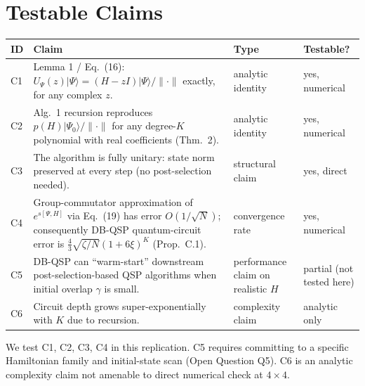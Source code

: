 \documentclass[11pt]{article}
\begin{document}
\section{Testable Claims}
\begin{table}[h]
\centering\small
\begin{tabular}{lp{7.8cm}ll}
\toprule
\textbf{ID} & \textbf{Claim} & \textbf{Type} & \textbf{Testable?} \\
\midrule
C1 & Lemma 1 / Eq.~(16): $U_\Psi(z)\lvert\Psi\rangle = (H-zI)\lvert\Psi\rangle/\lVert\cdot\rVert$ exactly, for any complex $z$. & analytic identity & yes, numerical \\
C2 & Alg.~1 recursion reproduces $p(H)\lvert\Psi_0\rangle/\lVert\cdot\rVert$ for any degree-$K$ polynomial with real coefficients (Thm.~2). & analytic identity & yes, numerical \\
C3 & The algorithm is fully unitary: state norm preserved at every step (no post-selection needed). & structural claim & yes, direct \\
C4 & Group-commutator approximation of $e^{s[\Psi,H]}$ via Eq.~(19) has error $O(1/\sqrt{N})$; consequently DB-QSP quantum-circuit error is $\tfrac{4}{3}\sqrt{\zeta/N}(1+6\xi)^K$ (Prop.~C.1). & convergence rate & yes, numerical \\
C5 & DB-QSP can ``warm-start'' downstream post-selection-based QSP algorithms when initial overlap $\gamma$ is small. & performance claim on realistic $H$ & partial (not tested here) \\
C6 & Circuit depth grows super-exponentially with $K$ due to recursion. & complexity claim & analytic only \\
\bottomrule
\end{tabular}
\end{table}

We test C1, C2, C3, C4 in this replication. C5 requires committing to a specific Hamiltonian family and initial-state scan (Open Question Q5). C6 is an analytic complexity claim not amenable to direct numerical check at $4\times 4$.
\end{document}
